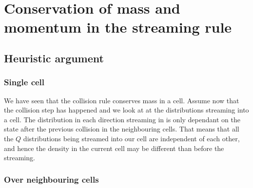 

\section{Conservation of mass and momentum in the streaming rule}

\subsection{Heuristic argument}

\subsubsection{Single cell}

We have seen that the collision rule conserves mass in a cell.
Assume now that the collision step has happened and we look at at the distributions
streaming into a cell. The distribution in each direction streaming in is only 
dependant on the state after the previous collision in the neighbouring cells.
That means that all the $Q$ distributions being streamed into our cell are
independent of each other, and hence the density in the current cell may be 
different than before the streaming.


\subsubsection{Over neighbouring cells}



